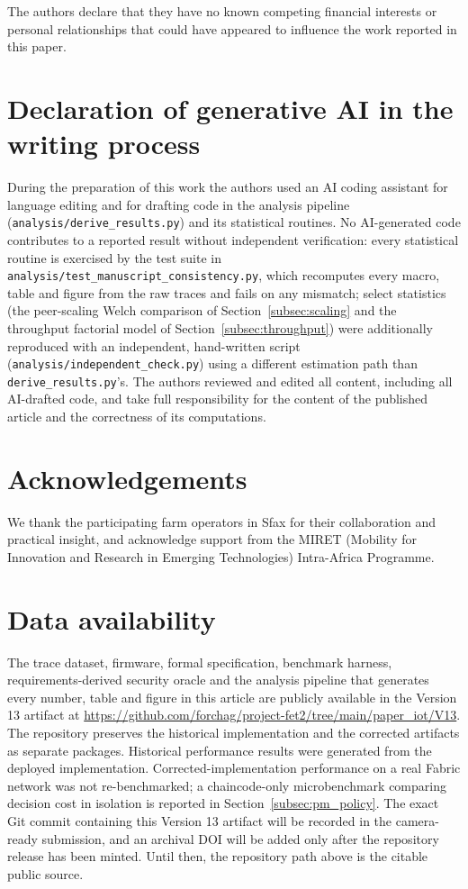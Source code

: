 \documentclass[a4paper,fleqn]{cas-sc}
\begin{document}
The authors declare that they have no known competing financial interests or
personal relationships that could have appeared to influence the work
reported in this paper.

\section*{Declaration of generative AI in the writing process}

During the preparation of this work the authors used an AI coding assistant
for language editing and for drafting code in the analysis pipeline
(\texttt{analysis/derive\_results.py}) and its statistical routines. No
AI-generated code contributes to a reported result without independent
verification: every statistical routine is exercised by the test suite in
\texttt{analysis/test\_manuscript\_consistency.py}, which recomputes every
macro, table and figure from the raw traces and fails on any mismatch;
select statistics (the peer-scaling Welch comparison of
Section~\ref{subsec:scaling} and the throughput factorial model of
Section~\ref{subsec:throughput}) were additionally reproduced with an
independent, hand-written script (\texttt{analysis/independent\_check.py})
using a different estimation path than \texttt{derive\_results.py}'s. The
authors reviewed and edited all content, including all AI-drafted code,
and take full responsibility for the content of the published article and
the correctness of its computations.

\section*{Acknowledgements}

We thank the participating farm operators in Sfax for their collaboration and
practical insight, and acknowledge support from the MIRET (Mobility for
Innovation and Research in Emerging Technologies) Intra-Africa Programme.

\section*{Data availability}

The trace dataset, firmware, formal specification, benchmark harness,
requirements-derived security oracle and the analysis pipeline that
generates every number, table and figure in this article are publicly
available in the Version 13 artifact at
\url{https://github.com/forchag/project-fet2/tree/main/paper_iot/V13}.
The repository preserves the historical implementation and the corrected
artifacts as separate packages. Historical performance results were
generated from the deployed implementation. Corrected-implementation
performance on a real Fabric network was not re-benchmarked; a
chaincode-only microbenchmark comparing decision cost in isolation is
reported in Section~\ref{subsec:pm_policy}. The exact Git commit containing
this Version 13 artifact will be recorded in the camera-ready submission,
and an archival DOI will be added only after the repository release has been
minted. Until then, the repository path above is the citable public source.

\clearpage


\end{document}
